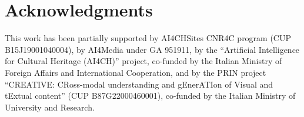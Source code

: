 \documentclass[sigconf]{acmart}
\begin{document}
\section*{Acknowledgments}
This work has been partially supported by AI4CHSites CNR4C program (CUP B15J19001040004), by AI4Media under GA 951911, by the ``Artificial Intelligence for Cultural Heritage (AI4CH)'' project, co-funded by the Italian Ministry of Foreign Affairs and International Cooperation, and by the PRIN project ``CREATIVE: CRoss-modal understanding and gEnerATIon of Visual and tExtual content'' (CUP B87G22000460001), co-funded by the Italian Ministry of University and Research.
 














\end{document}
